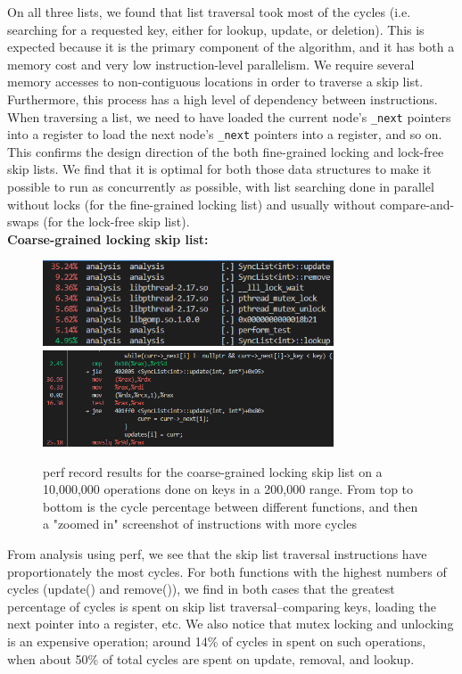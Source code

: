 \documentclass[11pt]{article}
\newcommand{\ttt}[1]{\texttt{#1}}
\begin{document}
On all three lists, we found that list traversal took most of the cycles (i.e. searching for a requested key, either for lookup, update, or deletion). This is expected because it is the primary component of the algorithm, and it has both a memory cost and very low instruction-level parallelism. We require several memory accesses to non-contiguous locations in order to traverse a skip list. Furthermore, this process has a high level of dependency between instructions. When traversing a list, we need to have loaded the current node's \ttt{\_next} pointers into a register to load the next node's \ttt{\_next} pointers into a register, and so on. This confirms the design direction of the both fine-grained locking and lock-free skip lists. We find that it is optimal for both those data structures to make it possible to run as concurrently as possible, with list searching done in parallel without locks (for the fine-grained locking list) and usually without compare-and-swaps (for the lock-free skip list). \\
\textbf{Coarse-grained locking skip list:} \\
\begin{figure}[h!]
\includegraphics[width=3.4in]{ex1_s0_overall_cycles.png}
\includegraphics[width=3.4in]{ex1_s0_cycles.png} \\
\caption{perf record results for the coarse-grained locking skip list on a 10,000,000 operations done on keys in a 200,000 range. From top to bottom is the cycle percentage between different functions, and then a "zoomed in" screenshot of instructions with more cycles}
\end{figure}
From analysis using perf, we see that the skip list traversal instructions have proportionately the most cycles. For both functions with the highest numbers of cycles (update() and remove()), we find in both cases that the greatest percentage of cycles is spent on skip list traversal--comparing keys, loading the next pointer into a register, etc. We also notice that mutex locking and unlocking is an expensive operation; around 14\% of cycles in spent on such operations, when about 50\% of total cycles are spent on update, removal, and lookup. 
\end{document}
